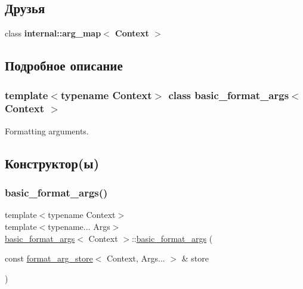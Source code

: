 \subsection*{Друзья}
\begin{DoxyCompactItemize}
\item 
\mbox{\label{classbasic__format__args_a7974100f026be256213827458684be38}} 
class {\bfseries internal\+::arg\+\_\+map$<$ Context $>$}
\end{DoxyCompactItemize}


\subsection{Подробное описание}
\subsubsection*{template$<$typename Context$>$\newline
class basic\+\_\+format\+\_\+args$<$ Context $>$}

Formatting arguments. 

\subsection{Конструктор(ы)}
\mbox{\label{classbasic__format__args_aff6e7b681609f33b18afb00281259ce2}} 
\subsubsection{\texorpdfstring{basic\+\_\+format\+\_\+args()}{basic\_format\_args()}\hspace{0.1cm}{\footnotesize\ttfamily [1/2]}}
{\footnotesize\ttfamily template$<$typename Context$>$ \\
template$<$typename... Args$>$ \\
\hyperlink{classbasic__format__args}{basic\+\_\+format\+\_\+args}$<$ Context $>$\+::\hyperlink{classbasic__format__args}{basic\+\_\+format\+\_\+args} (\begin{DoxyParamCaption}\item[{const \hyperlink{classformat__arg__store}{format\+\_\+arg\+\_\+store}$<$ Context, Args... $>$ \&}]{store }\end{DoxyParamCaption})\hspace{0.3cm}{\ttfamily [inline]}}

